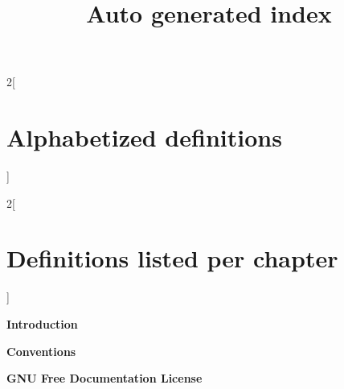 

\title{Auto generated index}
\maketitle

\label{section-phantom}

\tableofcontents

\frenchspacing


\begin{multicols}{2}[\section{Alphabetized definitions}\label{section-alphabetized}]
\end{multicols}

\begin{multicols}{2}[\section{Definitions listed per chapter}\label{section-per-chapter}]

\medskip\noindent
{\bf Introduction}

\medskip

\medskip\noindent
{\bf Conventions}

\medskip

\medskip\noindent
{\bf GNU Free Documentation License}

\medskip
\end{multicols}



